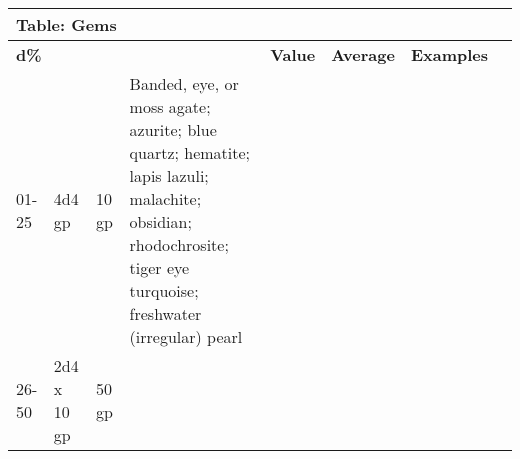 \vspace{12pt}
\begin{longtable}{llllllll}
\hline
\multicolumn{4}{|p{4.327in}|}{\begin{minipage}[t]{4.327in}\raggedright
\textbf{Table: Gems}\end{minipage}}\\
\hline
\multicolumn{4}{p{0.173in}|}{\begin{minipage}[t]{0.173in}\raggedright
\textbf{d\%}\end{minipage}} & \multicolumn{1}{|p{0.359in}|}{\begin{minipage}[t]{0.359in}\raggedright
\textbf{Value}\end{minipage}} & \multicolumn{1}{p{0.661in}|}{\begin{minipage}[t]{0.661in}\raggedright
\textbf{Average}\end{minipage}} & \multicolumn{1}{p{0.450in}|}{\begin{minipage}[t]{0.450in}\raggedright
\textbf{Examples}\end{minipage}}\\
\hline
\multicolumn{1}{p{2.858in}|}{\begin{minipage}[t]{2.858in}\raggedright
01-25\end{minipage}} & \multicolumn{1}{p{0.043in}|}{\begin{minipage}[t]{0.043in}\raggedright
4d4 gp\end{minipage}} & \multicolumn{1}{p{0.043in}|}{\begin{minipage}[t]{0.043in}\raggedright
10 gp\end{minipage}} & \multicolumn{1}{p{0.043in}|}{\begin{minipage}[t]{0.043in}\raggedright
Banded, eye, or moss agate; azurite; blue quartz; hematite; lapis lazuli; malachite; 
obsidian; rhodochrosite; tiger eye turquoise; freshwater (irregular) pearl\end{minipage}}\\
\hline
\multicolumn{1}{p{0.043in}|}{\begin{minipage}[t]{0.043in}\raggedright
26-50\end{minipage}} & \multicolumn{1}{|p{0.359in}|}{\begin{minipage}[t]{0.359in}\raggedright
2d4 x 10 gp\end{minipage}} & \multicolumn{1}{p{0.661in}|}{\begin{minipage}[t]{0.661in}\raggedright
50 gp\end{minipage}} & \multicolumn{1}{p{0.450in}|}{\begin{minipage}[t]{0.450in}\raggedright

\end{minipage}}
\end{longtable}
